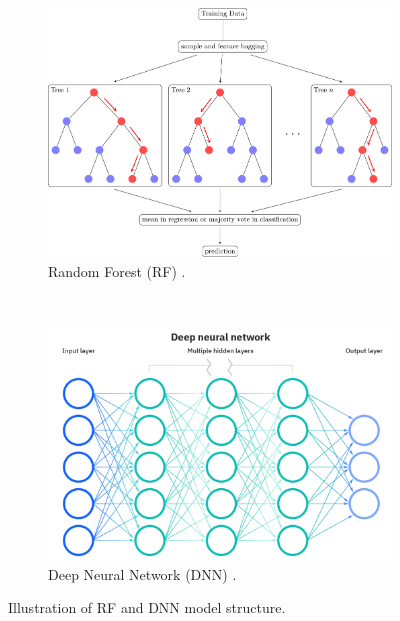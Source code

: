 \begin{figure}[!ht]
  \centering
  \begin{subfigure}[t]{0.9\textwidth}
    \includegraphics[width=\linewidth]{imgs/models/random-forest.png}
    \caption{Random Forest (RF) \citep{riebesellRandomForest2022}.} \label{fig:rf}
  \end{subfigure}\\
  \vspace{3em}
  \begin{subfigure}[t]{0.7\textwidth}
      \includegraphics[width=\linewidth]{imgs/models/DNN.png}
      \caption{Deep Neural Network (DNN) \citep{ibmNeuralNetworks2022}.} \label{fig:dnn}
  \end{subfigure}%
\caption{Illustration of RF and DNN model structure.} \label{fig:rf-dnn}
\end{figure}

